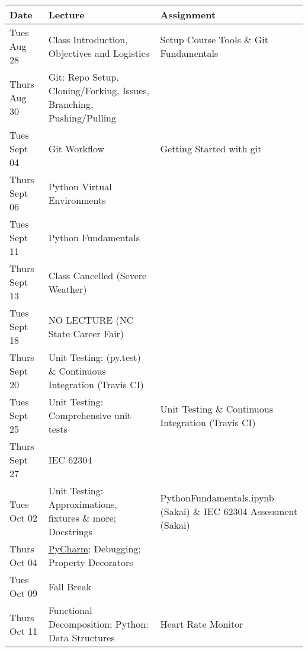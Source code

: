 \begin{longtable}[c]{|l|p{}|p{}|}

  \hline 
  
  \textbf{Date} & \textbf{Lecture} & \textbf{Assignment} \\

  \hline

  Tues Aug 28 & Class Introduction, Objectives and Logistics & Setup Course Tools \& Git Fundamentals \\ \hline

  Thurs Aug 30 & Git: Repo Setup, Cloning/Forking, Issues, Branching, Pushing/Pulling & \\ \hline
  
  Tues Sept 04 & Git Workflow & Getting Started with git \\ \hline
  
  Thurs Sept 06  & Python Virtual Environments & \\ \hline
  
  Tues Sept 11 & Python Fundamentals & \\ \hline
  
  Thurs Sept 13 & Class Cancelled (Severe Weather) & \\ \hline
  
  Tues Sept 18 & NO LECTURE (NC State Career Fair) & \\ \hline

  Thurs Sept 20 & Unit Testing: (py.test) \& Continuous Integration (Travis CI) & \\ \hline
  
  Tues Sept 25 & Unit Testing: Comprehensive unit tests & Unit Testing \& Continuous Integration (Travis CI) \\ \hline
  
  Thurs Sept 27 & IEC 62304 &  \\ \hline
  Tues Oct 02 & Unit Testing: Approximations, fixtures \& more; Docstrings & 
  PythonFundamentals.ipynb (Sakai) \& IEC 62304 Assessment (Sakai) \\ \hline
  
  Thurs Oct 04 & \href{Resources/pycharm.md}{PyCharm}; Debugging; Property Decorators & \\ \hline
  
  Tues Oct 09 & Fall Break & \\ \hline
  
  Thurs Oct 11 & Functional Decomposition; Python: Data Structures & Heart Rate Monitor \\ \hline
  

\end{longtable}
